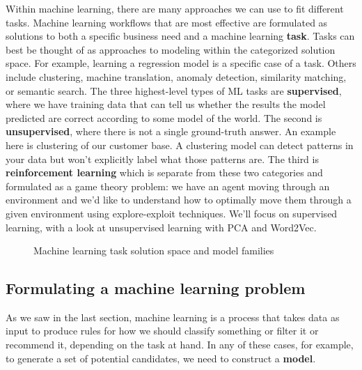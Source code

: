 \documentclass[11pt, table]{diazessay} %
\begin{document}
\begin{sloppypar}
Within machine learning, there are many approaches we can use to fit different tasks.  Machine learning workflows that are most effective are formulated as solutions to both a specific business need and a machine learning \textbf{task}. Tasks can best be thought of as approaches to modeling within the categorized solution space. For example, learning a regression model is a specific case of a task. Others include clustering, machine translation, anomaly detection, similarity matching, or semantic search.  The  three highest-level types of ML tasks are  \textbf{supervised}, where we have training data that can tell us whether the results the model predicted are correct according to some model of the world. The second is \textbf{unsupervised}, where there is not a single ground-truth answer. An example here is clustering of our customer base. A clustering model can detect patterns in your data but won't explicitly label what those patterns are. The third is \textbf{reinforcement learning}  which is separate from these two categories and formulated as a game theory problem: we have an agent moving through an environment and we'd like to understand how to optimally move them through a given environment using explore-exploit techniques. We'll focus on supervised learning, with a look at unsupervised learning with PCA and Word2Vec.
 
\begin{figure}[H]
    \centering
	 \caption{Machine learning task solution space and model families}
\end{figure}


\subsection{Formulating a machine learning problem}

As we saw in the last section, machine learning is a process that takes data as input to produce rules for how we should classify something or filter it or recommend it, depending on the task at hand. In any of these cases, for example, to generate a set of potential candidates, we need to construct a \textbf{model}.


\end{sloppypar}
\end{document}
